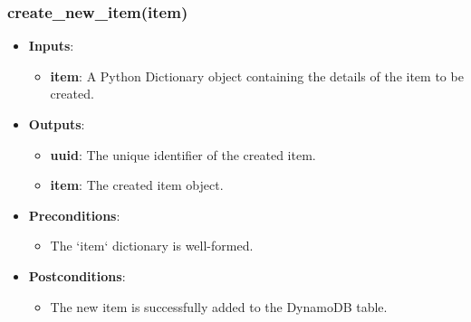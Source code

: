 \documentclass[12pt, titlepage]{article}
\begin{document}
\subsubsection{create\_new\_item(item)}
\begin{itemize}
    \item \textbf{Inputs}:
        \begin{itemize}
            \item \textbf{item}: A Python Dictionary object containing the details of the item to be created.
        \end{itemize}
    \item \textbf{Outputs}:
        \begin{itemize}
            \item \textbf{uuid}: The unique identifier of the created item.
            \item \textbf{item}: The created item object.
        \end{itemize}
    \item \textbf{Preconditions}:
        \begin{itemize}
            \item The `item` dictionary is well-formed.
        \end{itemize}
    \item \textbf{Postconditions}:
        \begin{itemize}
            \item The new item is successfully added to the DynamoDB table.
        \end{itemize}
\end{itemize}
\end{document}

